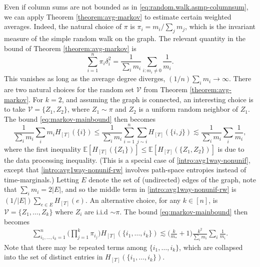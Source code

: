 \documentclass[11pt,reqno]{amsart}
\numberwithin{equation}{section}
\theoremstyle{definition}
\def\E{{\mathbb E}}
\def\V{{\mathcal V}}
\begin{document}
	Even if column sums are not bounded as in \eqref{eq:random.walk.asmp-columnsum}, we can apply Theorem \ref{theorem:avg-markov} to estimate certain weighted averages. Indeed,  the natural choice of $\pi$ is $\pi_i=m_i/\sum_jm_j$, which is the invariant measure of the simple random walk on the graph. The relevant quantity in the bound of Theorem \ref{theorem:avg-markov} is
	\begin{equation}
	\sum_{i=1}^n\pi_i \delta_i^2 = \frac{1}{\sum_i m_i}\sum_{i: m_i \neq 0} \frac{1}{m_i}. \label{ineq:nonunif-avg-rw}
	\end{equation}
	This vanishes as long as the average degree diverges, $(1/n)\sum_im_i \to \infty$. There are two natural choices for the random set $\V$ from Theorem \ref{theorem:avg-markov}. For $k=2$, and assuming the graph is connected, an interesting choice is to take $\V=\{Z_1,Z_2\}$, where $Z_1\sim\pi$ and $Z_2$ is a uniform random neighbor of $Z_1$. The bound \eqref{eq:markov-mainbound} then becomes 
	\begin{equation}
\frac{1}{\sum_im_i}\sum_i m_i H_{[T]}(\{i\}) \le \frac{1}{\sum_im_i}\sum_{i=1}^n \sum_{j \sim i}  H_{[T]}(\{i,j\}) \lesssim  \frac{1}{\sum_i m_i}\sum_{i} \frac{1}{m_i}, \label{intro:avg1way-nonunif-rw}
\end{equation}
where the first inequality $\E[H_{[T]}(\{Z_1\})] \le \E[H_{[T]}(\{Z_1,Z_2\})]$ is due to the data processing inequality. (This is a special case of \eqref{intro:avg1way-nonunif}, except that \eqref{intro:avg1way-nonunif-rw} involves path-space entropies instead of time-marginals.)
Letting $E$ denote the set of (undirected) edges of the graph, note that $\sum_im_i=2|E|$, and so the middle term in \eqref{intro:avg1way-nonunif-rw} is $(1/|E|)\sum_{e \in E}{H_{[T]}(e)}$.  An alternative choice, for any $k \in [n]$, is $\V=\{Z_1,\ldots,Z_k\}$ where $Z_i$ are i.i.d $\sim \pi$. The bound \eqref{eq:markov-mainbound} then becomes 
\begin{align*}
\sum_{i_1,\ldots,i_k=1}^n \bigg(\prod_{j=1}^k\pi_{i_j}\bigg) H_{[T]}(\{i_1,\ldots,i_k\}) \lesssim \bigg(\frac{k}{m_*} + 1\bigg) \frac{k^2}{\sum_i m_i}\sum_{i} \frac{1}{m_i} .
\end{align*}
Note that there may be repeated terms among $\{i_1,\ldots,i_k\}$, which are collapsed into the set of distinct entries in $H_{[T]}(\{i_1,\ldots,i_k\})$.
\end{document}
